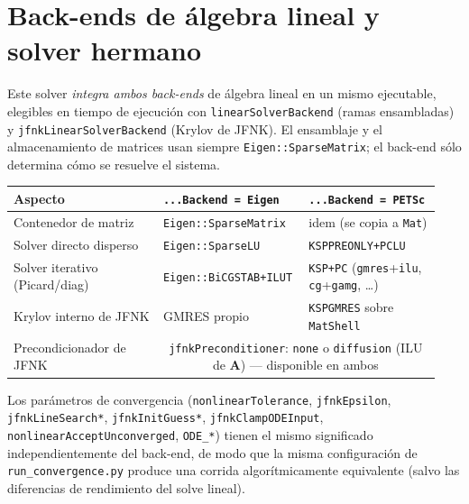 \documentclass[11pt,a4paper]{article}
\newcommand{\code}[1]{\texttt{\small #1}}
\newcommand{\Aimp}{\mathbf{A}}
\begin{document}
\section{Back-ends de álgebra lineal y solver hermano}
\label{sec:backends}

Este solver \emph{integra ambos back-ends} de álgebra lineal en un mismo
ejecutable, elegibles en tiempo de ejecución con \code{linearSolverBackend} (ramas
ensambladas) y \code{jfnkLinearSolverBackend} (Krylov de JFNK). El ensamblaje y el
almacenamiento de matrices usan siempre \code{Eigen::SparseMatrix}; el back-end sólo
determina cómo se resuelve el sistema.

\begin{center}
\begin{tabular}{@{}p{0.34\linewidth}p{0.30\linewidth}p{0.30\linewidth}@{}}
\toprule
Aspecto & \code{...Backend = Eigen} & \code{...Backend = PETSc} \\
\midrule
Contenedor de matriz & \code{Eigen::SparseMatrix} & idem (se copia a \code{Mat}) \\
Solver directo disperso & \code{Eigen::SparseLU} & \code{KSPPREONLY+PCLU} \\
Solver iterativo (Picard/diag) & \code{Eigen::BiCGSTAB+ILUT} &
    \code{KSP+PC} (\code{gmres}+\code{ilu}, \code{cg}+\code{gamg}, \dots) \\
Krylov interno de JFNK & GMRES propio & \code{KSPGMRES} sobre \code{MatShell} \\
Precondicionador de JFNK & \multicolumn{2}{c}{\code{jfnkPreconditioner}: \code{none} o
    \code{diffusion} (ILU de $\Aimp$) --- disponible en ambos} \\
\bottomrule
\end{tabular}
\end{center}

Los parámetros de convergencia (\code{nonlinearTolerance}, \code{jfnkEpsilon},
\code{jfnkLineSearch*}, \code{jfnkInitGuess*}, \code{jfnkClampODEInput},
\code{nonlinearAcceptUnconverged}, \code{ODE\_*}) tienen el mismo significado
independientemente del back-end, de modo que la misma configuración de
\code{run\_convergence.py} produce una corrida algorítmicamente equivalente (salvo
las diferencias de rendimiento del solve lineal).
\end{document}
